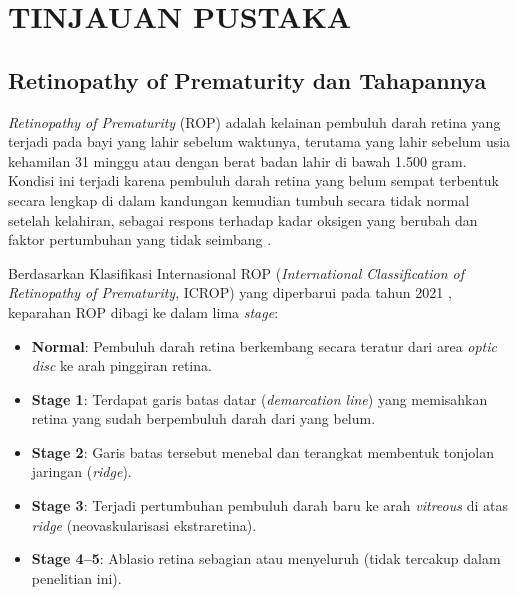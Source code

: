 
\chapter{TINJAUAN PUSTAKA}

\section{Retinopathy of Prematurity dan Tahapannya}

\textit{Retinopathy of Prematurity} (ROP) adalah kelainan pembuluh darah retina yang terjadi
pada bayi yang lahir sebelum waktunya, terutama yang lahir sebelum usia kehamilan 31 minggu
atau dengan berat badan lahir di bawah 1.500 gram. Kondisi ini terjadi karena pembuluh darah
retina yang belum sempat terbentuk secara lengkap di dalam kandungan kemudian tumbuh secara
tidak normal setelah kelahiran, sebagai respons terhadap kadar oksigen yang berubah dan
faktor pertumbuhan yang tidak seimbang \citep{Chiang2021}.

Berdasarkan Klasifikasi Internasional ROP (\textit{International Classification of
Retinopathy of Prematurity}, ICROP) yang diperbarui pada tahun 2021 \citep{Chiang2021},
keparahan ROP dibagi ke dalam lima \textit{stage}:

\begin{itemize}
    \item \textbf{Normal}: Pembuluh darah retina berkembang secara teratur dari area \textit{optic
    disc} ke arah pinggiran retina.
    \item \textbf{Stage 1}: Terdapat garis batas datar (\textit{demarcation line}) yang
    memisahkan retina yang sudah berpembuluh darah dari yang belum.
    \item \textbf{Stage 2}: Garis batas tersebut menebal dan terangkat membentuk tonjolan
    jaringan (\textit{ridge}).
    \item \textbf{Stage 3}: Terjadi pertumbuhan pembuluh darah baru ke arah \textit{vitreous} di
    atas \textit{ridge} (neovaskularisasi ekstraretina).
    \item \textbf{Stage 4--5}: Ablasio retina sebagian atau menyeluruh (tidak tercakup
    dalam penelitian ini).
\end{itemize}

